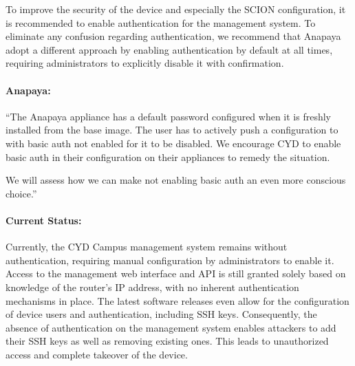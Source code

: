 To improve the security of the device and especially the SCION configuration, it is recommended to enable authentication for the management system.
To eliminate any confusion regarding authentication, we recommend that Anapaya adopt a different approach by enabling authentication by default at all times, requiring administrators to explicitly disable it with confirmation.


\begin{boxH}
\paragraph{Anapaya:}
``The Anapaya appliance has a default password configured when it is freshly installed from the base image. The user has to actively push a configuration to with basic auth not enabled for it to be disabled.
We encourage CYD to enable basic auth in their configuration on their appliances to remedy the situation.

We will assess how we can make not enabling basic auth an even more conscious choice.''
\end{boxH}

\paragraph{Current Status:}
Currently, the CYD Campus management system remains without authentication, requiring manual configuration by administrators to enable it.
Access to the management web interface and API is still granted solely based on knowledge of the router's IP address, with no inherent authentication mechanisms in place.
The latest software releases even allow for the configuration of device users and authentication, including SSH keys.
Consequently, the absence of authentication on the management system enables attackers to add their SSH keys as well as removing existing ones.
This leads to unauthorized access and complete takeover of the device.


